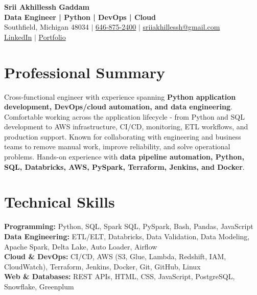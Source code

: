 \documentclass[letterpaper,10pt]{article}
\begin{document}
\fontsize{9.35pt}{10.45pt}\selectfont

\begin{center}
    {\LARGE \textbf{Srii Akhillessh Gaddam}} \\[-1pt]
    \textbf{Data Engineer | Python | DevOps | Cloud} \\[2pt]
    Southfield, Michigan 48034 $|$
    \href{tel:6468752400}{646-875-2400} $|$
    \href{mailto:sriiakhillessh@gmail.com}{sriiakhillessh@gmail.com} \\[1pt]
    \href{https://www.linkedin.com/in/srii-akhiilessh-gaddam-b48668191/}{LinkedIn} $|$
    \href{https://sriiakhillesshg.github.io/portfolio/}{Portfolio}
\end{center}
\vspace{-8pt}

\section{Professional Summary}
\small{Cross-functional engineer with experience spanning \textbf{Python application development, DevOps/cloud automation, and data engineering}. Comfortable working across the application lifecycle - from Python and SQL development to AWS infrastructure, CI/CD, monitoring, ETL workflows, and production support. Known for collaborating with engineering and business teams to remove manual work, improve reliability, and solve operational problems. Hands-on experience with \textbf{data pipeline automation, Python, SQL, Databricks, AWS, PySpark, Terraform, Jenkins, and Docker}.}

\section{Technical Skills}
\small{
\textbf{Programming:} Python, SQL, Spark SQL, PySpark, Bash, Pandas, JavaScript \\
\textbf{Data Engineering:} ETL/ELT, Databricks, Data Validation, Data Modeling, Apache Spark, Delta Lake, Auto Loader, Airflow \\
\textbf{Cloud \& DevOps:} CI/CD, AWS (S3, Glue, Lambda, Redshift, IAM, CloudWatch), Terraform, Jenkins, Docker, Git, GitHub, Linux \\
\textbf{Web \& Databases:} REST APIs, HTML, CSS, JavaScript, PostgreSQL, Snowflake, Greenplum
}

\end{document}
